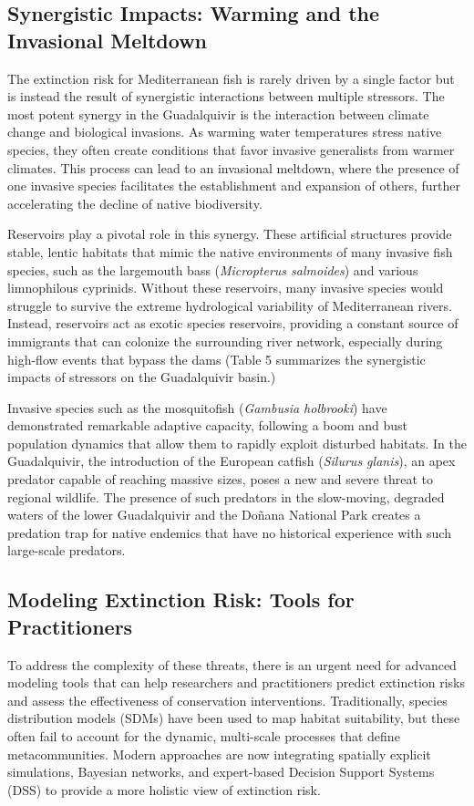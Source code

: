 \documentclass[11pt,a4paper]{article}
\begin{document}
\subsection{Synergistic Impacts: Warming and the Invasional Meltdown}
The extinction risk for Mediterranean fish is rarely driven by a single factor but is instead the result of synergistic interactions between multiple stressors. The most potent synergy in the Guadalquivir is the interaction between climate change and biological invasions. As warming water temperatures stress native species, they often create conditions that favor invasive generalists from warmer climates. This process can lead to an invasional meltdown, where the presence of one invasive species facilitates the establishment and expansion of others, further accelerating the decline of native biodiversity.

Reservoirs play a pivotal role in this synergy. These artificial structures provide stable, lentic habitats that mimic the native environments of many invasive fish species, such as the largemouth bass (\textit{Micropterus salmoides}) and various limnophilous cyprinids. Without these reservoirs, many invasive species would struggle to survive the extreme hydrological variability of Mediterranean rivers. Instead, reservoirs act as exotic species reservoirs, providing a constant source of immigrants that can colonize the surrounding river network, especially during high-flow events that bypass the dams (Table 5 summarizes the synergistic impacts of stressors on the Guadalquivir basin.)

Invasive species such as the mosquitofish (\textit{Gambusia holbrooki}) have demonstrated remarkable adaptive capacity, following a boom and bust population dynamics that allow them to rapidly exploit disturbed habitats. In the Guadalquivir, the introduction of the European catfish (\textit{Silurus glanis}), an apex predator capable of reaching massive sizes, poses a new and severe threat to regional wildlife. The presence of such predators in the slow-moving, degraded waters of the lower Guadalquivir and the Doñana National Park creates a predation trap for native endemics that have no historical experience with such large-scale predators.

\subsection{Modeling Extinction Risk: Tools for Practitioners}
To address the complexity of these threats, there is an urgent need for advanced modeling tools that can help researchers and practitioners predict extinction risks and assess the effectiveness of conservation interventions. Traditionally, species distribution models (SDMs) have been used to map habitat suitability, but these often fail to account for the dynamic, multi-scale processes that define metacommunities. Modern approaches are now integrating spatially explicit simulations, Bayesian networks, and expert-based Decision Support Systems (DSS) to provide a more holistic view of extinction risk.
\end{document}
